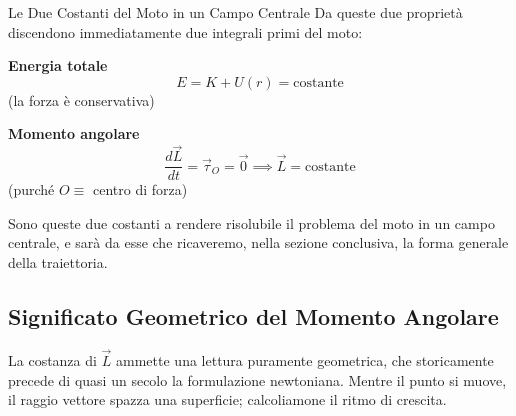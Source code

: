 \begin{formulario}{Le Due Costanti del Moto in un Campo Centrale}
Da queste due proprietà discendono immediatamente due integrali primi del moto:
\begin{minipage}[t]{0.47\textwidth}
\centering \textbf{Energia totale}
\begin{equation*}
    E = K + U(r) = \text{costante}
\end{equation*}
\centering \footnotesize (la forza è conservativa)
\end{minipage}
\hfill
\begin{minipage}[t]{0.47\textwidth}
\centering \textbf{Momento angolare}
\begin{equation*}
    \frac{d\vec{L}}{dt} = \vec{\tau}_O = \vec{0} \implies \vec{L} = \text{costante}
\end{equation*}
\centering \footnotesize (purché $O \equiv$ centro di forza)
\end{minipage}
\vspace{4pt}
\end{formulario}

Sono queste due costanti a rendere risolubile il problema del moto in un campo centrale, e sarà da esse che ricaveremo, nella sezione conclusiva, la forma generale della traiettoria.

\subsection{Significato Geometrico del Momento Angolare}

La costanza di $\vec{L}$ ammette una lettura puramente geometrica, che storicamente precede di quasi un secolo la formulazione newtoniana. Mentre il punto si muove, il raggio vettore spazza una superficie; calcoliamone il ritmo di crescita.


